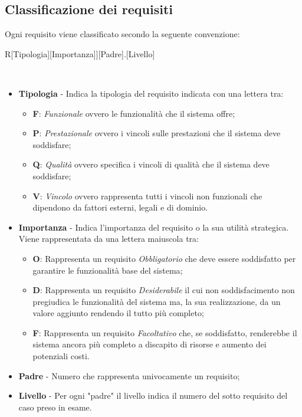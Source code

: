 \subsection{Classificazione dei requisiti}
Ogni requisito viene classificato secondo la seguente convenzione:\\
\centerline{R[Tipologia][Importanza]][Padre].[Livello]}\\
\begin{itemize}
	\item \textbf{Tipologia} - Indica la tipologia del requisito indicata con una lettera tra:
	\begin{itemize}
		\item \textbf{F}: \textit{Funzionale} ovvero le funzionalità che il sistema offre;
		\item \textbf{P}: \textit{Prestazionale} ovvero i vincoli sulle prestazioni che il sistema deve soddisfare;
		\item \textbf{Q}: \textit{Qualità} ovvero specifica i vincoli di qualità che il sistema deve soddisfare;
		\item \textbf{V}: \textit{Vincolo} ovvero rappresenta tutti i vincoli non funzionali che dipendono da fattori esterni, legali e di dominio.
	\end{itemize}
	\item \textbf{Importanza} - Indica l'importanza del requisito o la sua utilità strategica. Viene rappresentata da una lettera maiuscola tra:
	\begin{itemize}
		\item \textbf{O}: Rappresenta un requisito \textit{Obbligatorio} che deve essere soddisfatto per garantire le funzionalità base del sistema;
		\item \textbf{D}: Rappresenta un requisito \textit{Desiderabile} il cui non soddisfacimento non pregiudica le funzionalità del sistema ma, la sua realizzazione, da un valore aggiunto rendendo il tutto più completo;
		\item \textbf{F}: Rappresenta un requisito \textit{Facoltativo} che, se soddisfatto, renderebbe il sistema ancora più completo a discapito di risorse e aumento dei potenziali costi.
	\end{itemize}
	\item \textbf{Padre} - Numero che rappresenta univocamente un requisito;
	\item \textbf{Livello} - Per ogni "padre" il livello indica il numero del sotto requisito del caso preso in esame.
\end{itemize}
